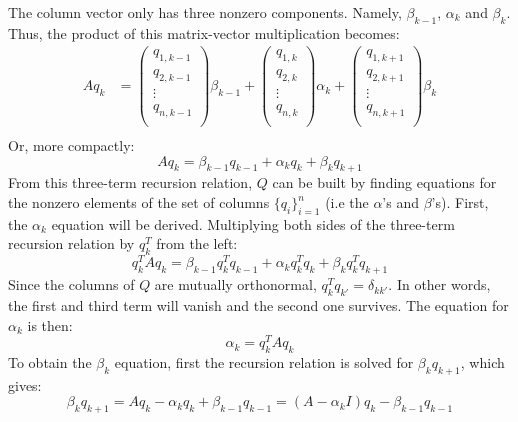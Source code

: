 %
The column vector only has three nonzero components. Namely, $\beta_{k-1}$, $\alpha_{k}$ and $\beta_{k}$. Thus, the product of this matrix-vector multiplication becomes:
%
 \begin{align}
A q_k &= \begin{pmatrix}
q_{1,k-1} \\
q_{2,k-1} \\
\vdots \\
q_{n,k-1} \\
\end{pmatrix} \beta_{k-1} + 
\begin{pmatrix}
q_{1,k} \\
q_{2,k} \\
\vdots \\
q_{n,k} \\
\end{pmatrix} \alpha_{k} +
\begin{pmatrix}
q_{1,k+1} \\
q_{2,k+1} \\
\vdots \\
q_{n,k+1} \\
\end{pmatrix} \beta_{k} \\
\end{align}
%
Or, more compactly:
%
\begin{equation}
A q_{k} = \beta_{k-1} q_{k-1} + \alpha_{k} q_{k} + \beta_{k} q_{k+1}
\end{equation}
%
From this three-term recursion relation, $Q$ can be built by finding equations for the nonzero elements of the set of columns $\lbrace q_i \rbrace_{i=1}^{n}$ (i.e the $\alpha$'s and $\beta$'s). First, the $\alpha_k$ equation will be derived. Multiplying both sides of the three-term recursion relation by $q_{k}^{T}$ from the left:
%
\begin{equation} 
q_{k}^{T} A q_{k} = \beta_{k-1} q_{k}^{T}q_{k-1} + \alpha_{k} q_{k}^{T} q_{k} + \beta_{k} q_{k}^{T} q_{k+1}
\end{equation}
%
Since the columns of $Q$ are mutually orthonormal, $q_{k}^{T}q_{k'} = \delta_{kk'}$. In other words, the first and third term will vanish and the second one survives. The equation for $\alpha_{k}$ is then:
%
\begin{equation} 
\alpha_{k} = q_{k}^{T} A q_{k}
\end{equation}
%
To obtain the $\beta_{k}$ equation, first the recursion relation is solved for $\beta_{k}q_{k+1}$, which gives:
%
\begin{equation}
\beta_{k} q_{k+1} = A q_{k} - \alpha_k q_k + \beta_{k-1} q_{k-1} = (A-\alpha_k I) q_k - \beta_{k-1} q_{k-1}
\end{equation}
%

